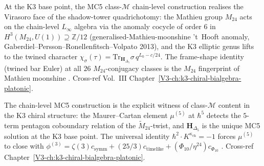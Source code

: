 \begin{remark}
\label{rem:mc5clmp-1}
At the K3 base point, the MC5 class-$\mathcal M$ chain-level construction
realises the Virasoro face of the shadow-tower quadrichotomy:
the Mathieu group $M_{24}$ acts on the chain-level $L_\infty$ algebra
via the anomaly cocycle of order $6$ in
$H^3(M_{24}, U(1)) \supseteq \mathbb Z/12$ (generalised-Mathieu-moonshine
't~Hooft anomaly, Gaberdiel--Persson--Ronellenfitsch--Volpato 2013),
and the K3 elliptic genus lifts to
the twined character
$\chi_\sigma(\tau) = \mathrm{Tr}_{\mathbf H_{\Delta_5}}\sigma\,q^{L_0-c/24}$.
The frame-shape identity (twined bar Euler) at all $26$ $M_{24}$-conjugacy
classes is the $M_{24}$ fingerprint of Mathieu moonshine
\cite{EguchiOoguriTachikawa2010,ChengDuncanHarvey2014}.
Cross-ref Vol.~III Chapter~\ref{V3-ch:k3-chiral-bialgebra-platonic}.
\end{remark}

\begin{remark}
\label{rem:mc5clmp-2}
The chain-level MC5 construction is the explicit witness of class-$\mathcal M$
content in the K3 chiral structure: the Maurer--Cartan element
$\mu^{(5)}$ at $\hbar^5$ detects the $5$-term pentagon coboundary
relation of the $\widetilde M_{24}$-twist, and $\mathbf H_{\Delta_5}$
is the unique MC5 solution at the K3 base point.
The universal identity $\hbar^2 \cdot K^{\kappa_{\mathrm{ch}}} = -1$ forces
$\mu^{(5)}$ to close with
$\phi^{(3)} = \zeta(3) c_{\mathrm{symm}} + (25/3) c_{\mathrm{timelike}} + (\Phi_{10}/\eta^{24}) c_{\Phi_{10}}$
\cite{GritsenkoNikulin1998,ChengDuncanHarvey2014}. Cross-ref
Chapter~\ref{V3-ch:k3-chiral-bialgebra-platonic}.
\end{remark}

